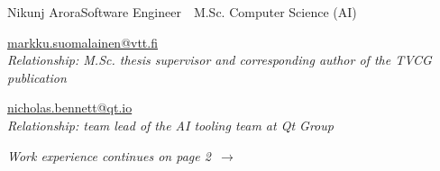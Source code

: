 \documentclass{article}
\begin{document}
\begin{cv}[avatar]{Nikunj Arora}{Software Engineer \,\textbullet\, M.Sc. Computer Science (AI)}
\begin{cvitem}
	\href{mailto:markku.suomalainen@vtt.fi}{markku.suomalainen@vtt.fi}\\
	{\small\itshape Relationship: M.Sc. thesis supervisor and corresponding author of the TVCG publication}
\end{cvitem}

\cvseparator[2]
\begin{cvitem}
	\href{mailto:nicholas.bennett@qt.io}{nicholas.bennett@qt.io}\\
	{\small\itshape Relationship: team lead of the AI tooling team at Qt Group}
\end{cvitem}

\vfill
{\raggedleft\small\itshape Work experience continues on page 2 \,$\rightarrow$\par}

\end{cv}
\end{document}
